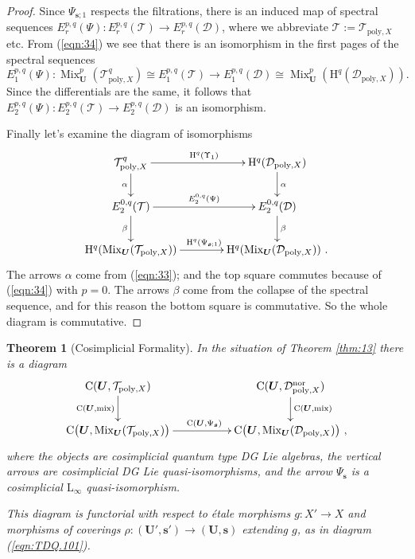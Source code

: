 \documentclass[a4paper, 10pt]{amsart}
\newtheorem{thm}[equation]{Theorem}
\theoremstyle{definition}
\numberwithin{equation}{section}
\newcommand{\opn}{\operatorname}
\newcommand{\mcal}[1]{\mathcal{#1}}
\newcommand{\mrm}[1]{\mathrm{#1}}
\newcommand{\tup}[1]{\textup{#1}}
\newcommand{\bsym}[1]{\boldsymbol{#1}}
\newcommand{\al}{\alpha}
\newcommand{\be}{\beta}
\begin{document}
\begin{proof}
Since $\Psi_{\bsym{s}; 1}$ respects the filtrations, there is an induced 
map of spectral sequences
$E_r^{p, q}(\Psi) : E_r^{p, q}(\mcal{T}) \to E_r^{p, q}(\mcal{D})$,
where we abbreviate 
$\mcal{T} := \mcal{T}_{\mrm{poly}, X}$ etc. 
{}From (\ref{eqn:34}) we see that there is an isomorphism in the first pages of
the spectral sequences
\[ E_1^{p, q}(\Psi) :
\opn{Mix}^p_{\bsym{U}}(\mcal{T}^q_{\mrm{poly}, X})  \cong
E_1^{p, q}(\mcal{T}) \to E_1^{p, q}(\mcal{D}) \cong
\opn{Mix}^p_{\bsym{U}}(\mrm{H}^{q}  (\mcal{D}_{\mrm{poly}, X})) . \]
Since the differentials are the same, it follows that
$E_2^{p, q}(\Psi) : E_2^{p, q}(\mcal{T}) \to E_2^{p, q}(\mcal{D})$
is an isomorphism.

Finally let's examine the diagram of isomorphisms
\[ \UseTips \xymatrix @C=9ex @R=5ex {
\mcal{T}^q_{\mrm{poly}, X}
\ar[r]^{\mrm{H}^q(\Upsilon_1)}
\ar[d]_{\alpha}
&
\mrm{H}^q (\mcal{D}_{\mrm{poly}, X})
\ar[d]^{\alpha}
\\
E_2^{0, q}(\mcal{T}) 
\ar[r]^{E_2^{0, q}(\Psi)}
\ar[d]_{\be}
&
E_2^{0, q}(\mcal{D}) 
\ar[d]^{\be}
\\
\mrm{H}^q (\opn{Mix}_{\bsym{U}}(\mcal{T}_{\mrm{poly}, X}))
\ar[r]^{\mrm{H}^q(\Psi_{\bsym{s}; 1})}
&
\mrm{H}^q (\opn{Mix}_{\bsym{U}}(\mcal{D}_{\mrm{poly}, X})) \ .
} \]
The arrows $\al$ come from (\ref{eqn:33}); and the top square commutes
because of (\ref{eqn:34}) with $p = 0$.
The arrows $\be$ come from the collapse of the spectral sequence, and for
this reason the bottom square is commutative. So the whole diagram is
commutative.
\end{proof}

\begin{thm}[Cosimplicial Formality] \label{thm:221}
In the situation of Theorem \tup{\ref{thm:13}} there is a diagram
\[ \UseTips \xymatrix @C=12ex @R=5ex {
\mrm{C}(\bsym{U}, \mcal{T}_{\mrm{poly}, X})
\ar[d]_{\opn{C}(\bsym{U}, \opn{mix})}
&
\mrm{C}(\bsym{U}, \mcal{D}_{\mrm{poly}, X}^{\mrm{nor}})
\ar[d]^{\opn{C}(\bsym{U}, \opn{mix})}
\\
\mrm{C} \bigl( \bsym{U} , \opn{Mix}_{\bsym{U}}(\mcal{T}_{\mrm{poly}, X})
\bigr)
\ar[r]^{\mrm{C}(\bsym{U} , \Psi_{\bsym{s}})} 
&
\mrm{C} \bigl( \bsym{U} , \opn{Mix}_{\bsym{U}}(\mcal{D}_{\mrm{poly}, X})
\bigr) \ ,
} \]
where the objects are cosimplicial quantum type DG Lie algebras, the
vertical arrows are cosimplicial DG Lie quasi-isomorphisms, and the arrow 
$\Psi_{\bsym{s}}$ is a cosimplicial $\mrm{L}_{\infty}$ quasi-isomorphism. 

This diagram is functorial with respect to 
\'etale morphisms $g : X' \to X$ and morphisms of coverings 
$\rho : (\bsym{U}', \bsym{s}') \to (\bsym{U}, \bsym{s})$
extending $g$, as in diagram \tup{(\ref{eqn:TDQ.101})}. 
\end{thm}
\end{document}
